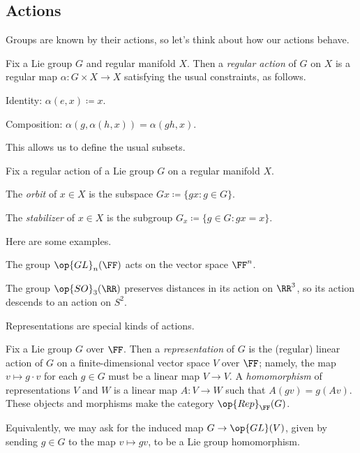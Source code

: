 \documentclass[../notes.tex]{subfiles}
\begin{document}
\subsection{Actions}
Groups are known by their actions, so let's think about how our actions behave.
\begin{definition}[action]
	Fix a Lie group $G$ and regular manifold $X$. Then a \textit{regular action} of $G$ on $X$ is a regular map $\alpha\colon G\times X\to X$ satisfying the usual constraints, as follows.
	\begin{listalph}
		\item Identity: $\alpha(e,x)\coloneqq x$.
		\item Composition: $\alpha(g,\alpha(h,x))=\alpha(gh,x)$.
	\end{listalph}
\end{definition}
This allows us to define the usual subsets.
\begin{defihelper}  
	Fix a regular action of a Lie group $G$ on a regular manifold $X$.
	\begin{listalph}
		\item The \textit{orbit} of $x\in X$ is the subspace $Gx\coloneqq\{gx:g\in G\}$.
		\item The \textit{stabilizer} of $x\in X$ is the subgroup $G_x\coloneqq\{g\in G:gx=x\}$.
	\end{listalph}
\end{defihelper}
Here are some examples.
\begin{example}
	The group $\op{GL}_n(\FF)$ acts on the vector space $\FF^n$.
\end{example}
\begin{example} \label{ex:so3-action}
	The group $\op{SO}_3(\RR)$ preserves distances in its action on $\RR^3$, so its action descends to an action on $S^2$.
\end{example}
Representations are special kinds of actions.
\begin{definition}[representation]
	Fix a Lie group $G$ over $\FF$. Then a \textit{representation} of $G$ is the (regular) linear action of $G$ on a finite-dimensional vector space $V$ over $\FF$; namely, the map $v\mapsto g\cdot v$ for each $g\in G$ must be a linear map $V\to V$. A \textit{homomorphism} of representations $V$ and $W$ is a linear map $A\colon V\to W$ such that $A(gv)=g(Av)$. These objects and morphisms make the category $\op{Rep}_{\FF}(G)$.
\end{definition}
\begin{remark}
	Equivalently, we may ask for the induced map $G\to\op{GL}(V)$, given by sending $g\in G$ to the map $v\mapsto gv$, to be a Lie group homomorphism.
\end{remark}
\end{document}
